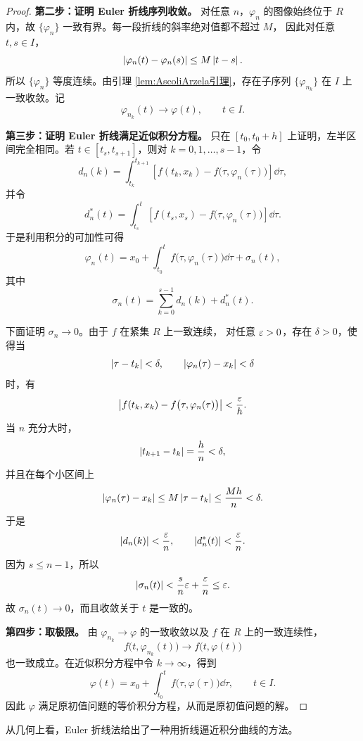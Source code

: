 \begin{proof}
	\noindent\textbf{第二步：证明 Euler 折线序列收敛。}\quad
	对任意 $n$，$\varphi_n$ 的图像始终位于 $R$ 内，故
	$\{\varphi_n\}$ 一致有界。每一段折线的斜率绝对值都不超过 $M$，
	因此对任意 $t,s\in I$，
	\[
		\left| \varphi_n(t)-\varphi_n(s) \right|
		\leq M\left| t-s \right|.
	\]
	所以 $\{\varphi_n\}$ 等度连续。由引理
	\ref{lem:AscoliArzela引理}，存在子序列
	$\{\varphi_{n_k}\}$ 在 $I$ 上一致收敛。记
	\[
		\varphi_{n_k}(t)\longrightarrow\varphi(t),
		\qquad t\in I.
	\]

	\noindent\textbf{第三步：证明 Euler 折线满足近似积分方程。}\quad
	只在 $[t_0,t_0+h]$ 上证明，左半区间完全相同。若
	$t\in[t_s,t_{s+1}]$，则对 $k=0,1,\ldots,s-1$，令
	\[
		d_n(k)
		=\int_{t_k}^{t_{k+1}}
		\left[
			f(t_k,x_k)-f\bigl(\tau,\varphi_n(\tau)\bigr)
		\right]\dd\tau,
	\]
	并令
	\[
		d_n^*(t)
		=\int_{t_s}^{t}
		\left[
			f(t_s,x_s)-f\bigl(\tau,\varphi_n(\tau)\bigr)
		\right]\dd\tau.
	\]
	于是利用积分的可加性可得
	\[
		\varphi_n(t)
		=x_0+\int_{t_0}^{t}
		f\bigl(\tau,\varphi_n(\tau)\bigr)\dd\tau
		+\sigma_n(t),
	\]
	其中
	\[
		\sigma_n(t)
		=\sum_{k=0}^{s-1}d_n(k)+d_n^*(t).
	\]

	下面证明 $\sigma_n\to0$。由于 $f$ 在紧集 $R$ 上一致连续，
	对任意 $\varepsilon>0$，存在 $\delta>0$，使得当
	\[
		\left| \tau-t_k \right|<\delta,
		\qquad
		\left| \varphi_n(\tau)-x_k \right|<\delta
	\]
	时，有
	\[
		\left| 
			f(t_k,x_k)-f\bigl(\tau,\varphi_n(\tau)\bigr)
		 \right|
		<\dfrac{\varepsilon}{h}.
	\]
	当 $n$ 充分大时，
	\[
		\left| t_{k+1}-t_k \right|
		=\dfrac{h}{n}<\delta,
	\]
	并且在每个小区间上
	\[
		\left| \varphi_n(\tau)-x_k \right|
		\leq M\left| \tau-t_k \right|
		\leq\dfrac{Mh}{n}<\delta.
	\]
	于是
	\[
		\left| d_n(k) \right|<\dfrac{\varepsilon}{n},
		\qquad
		\left| d_n^*(t) \right|<\dfrac{\varepsilon}{n}.
	\]
	因为 $s\leq n-1$，所以
	\[
		\left| \sigma_n(t) \right|
		<\dfrac{s}{n}\varepsilon+\dfrac{\varepsilon}{n}
		\leq\varepsilon.
	\]
	故 $\sigma_n(t)\to0$，而且收敛关于 $t$ 是一致的。

	\noindent\textbf{第四步：取极限。}\quad
	由 $\varphi_{n_k}\to\varphi$ 的一致收敛以及 $f$ 在 $R$ 上的一致连续性，
	\[
		f\bigl(t,\varphi_{n_k}(t)\bigr)
		\longrightarrow
		f\bigl(t,\varphi(t)\bigr)
	\]
	也一致成立。在近似积分方程中令 $k\to\infty$，得到
	\[
		\varphi(t)
		=x_0+\int_{t_0}^{t}
		f\bigl(\tau,\varphi(\tau)\bigr)\dd\tau,
		\qquad t\in I.
	\]
	因此 $\varphi$ 满足原初值问题的等价积分方程，从而是原初值问题的解。
\end{proof}

从几何上看，Euler 折线法给出了一种用折线逼近积分曲线的方法。

